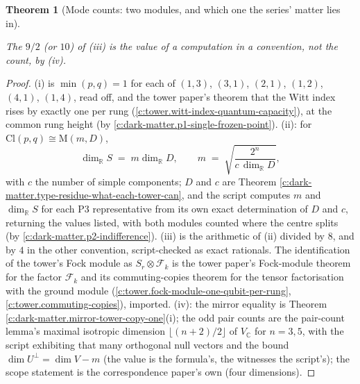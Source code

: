 \documentclass[11pt]{article}
\newtheorem{theorem}{Theorem}[section]
\theoremstyle{definition}
\theoremstyle{plain}
\providecommand{\C}{}\renewcommand{\C}{\mathbb{C}}
\providecommand{\Cl}{}\renewcommand{\Cl}{\mathrm{Cl}}
\providecommand{\Mat}{}\renewcommand{\Mat}{\mathrm{M}}
\providecommand{\R}{}\renewcommand{\R}{\mathbb{R}}
\begin{document}
\begin{theorem}[Mode counts: two modules, and which one the series' matter lies in]
\begin{enumerate}
\end{enumerate}
The $9/2$ (or $10$) of (iii) is the value of a computation in a convention, not the count, by (iv).
\end{theorem}
\begin{proof}
(i) is $\min(p,q) = 1$ for each of $(1,3)$, $(3,1)$, $(2,1)$, $(1,2)$, $(4,1)$, $(1,4)$, read off, and the tower paper's theorem that the Witt index rises by exactly one per rung (\ref{c:tower.witt-index-quantum-capacity}), at the common rung height (by \ref{c:dark-matter.p1-single-frozen-point}). (ii): for $\Cl(p,q) \cong \Mat(m, D)$,
\[
\dim_{\R} S \;=\; m \dim_{\R} D, \qquad m \;=\; \sqrt{\frac{2^{n}}{c\,\dim_{\R} D}},
\]
with $c$ the number of simple components; $D$ and $c$ are Theorem \ref{c:dark-matter.type-residue-what-each-tower-can}, and the script computes $m$ and $\dim_{\R} S$ for each P3 representative from its own exact determination of $D$ and $c$, returning the values listed, with both modules counted where the centre splits (by \ref{c:dark-matter.p2-indifference}). (iii) is the arithmetic of (ii) divided by $8$, and by $4$ in the other convention, script-checked as exact rationals. The identification of the tower's Fock module as $S_{r} \otimes \mathcal{F}_{k}$ is the tower paper's Fock-module theorem for the factor $\mathcal{F}_{k}$ and its commuting-copies theorem for the tensor factorisation with the ground module \cite[Thms.~4.2 and 3.2]{ButlerT3} (\ref{c:tower.fock-module-one-qubit-per-rung}, \ref{c:tower.commuting-copies}), imported. (iv): the mirror equality is Theorem \ref{c:dark-matter.mirror-tower-copy-one}(i); the odd pair counts are the pair-count lemma's maximal isotropic dimension $\lfloor (n+2)/2 \rfloor$ of $V_{\C}$ for $n = 3, 5$, with the script exhibiting that many orthogonal null vectors and the bound $\dim U^{\perp} = \dim V - m$ (the value is the formula's, the witnesses the script's); the scope statement is the correspondence paper's own (four dimensions).

\end{proof}
\end{document}
